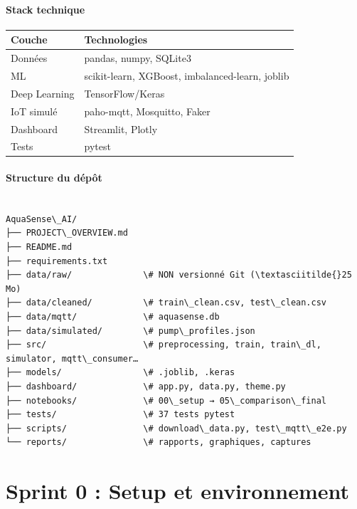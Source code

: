 \documentclass[11pt,a4paper]{report}
\begin{document}
\subsubsection{Stack technique}



\begin{longtable}{@{}ll@{}}
\toprule
Couche & Technologies \\
\midrule
Données & pandas, numpy, SQLite3 \\
ML & scikit-learn, XGBoost, imbalanced-learn, joblib \\
Deep Learning & TensorFlow/Keras \\
IoT simulé & paho-mqtt, Mosquitto, Faker \\
Dashboard & Streamlit, Plotly \\
Tests & pytest \\
\bottomrule
\end{longtable}




\subsubsection{Structure du dépôt}



\begin{lstlisting}

AquaSense\_AI/
├── PROJECT\_OVERVIEW.md
├── README.md
├── requirements.txt
├── data/raw/              \# NON versionné Git (\textasciitilde{}25 Mo)
├── data/cleaned/          \# train\_clean.csv, test\_clean.csv
├── data/mqtt/             \# aquasense.db
├── data/simulated/        \# pump\_profiles.json
├── src/                   \# preprocessing, train, train\_dl, simulator, mqtt\_consumer…
├── models/                \# .joblib, .keras
├── dashboard/             \# app.py, data.py, theme.py
├── notebooks/             \# 00\_setup → 05\_comparison\_final
├── tests/                 \# 37 tests pytest
├── scripts/               \# download\_data.py, test\_mqtt\_e2e.py
└── reports/               \# rapports, graphiques, captures

\end{lstlisting}





\chapter{Sprint 0 : Setup et environnement}
\end{document}
